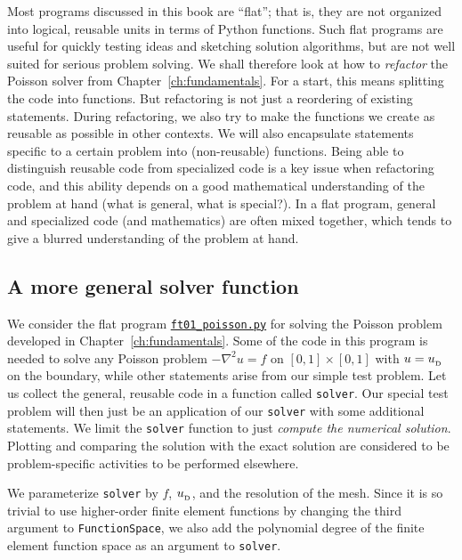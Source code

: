 \documentclass[graybox,envcountchap,sectrefs,final]{svmonodo}
\begin{document}

Most programs discussed in this book are ``flat''; that is, they are
not organized into logical, reusable units in terms of Python
functions. Such flat programs are useful for quickly testing ideas and
sketching solution algorithms, but are not well suited for serious
problem solving. We shall therefore look at how to \emph{refactor} the
Poisson solver from Chapter~\ref{ch:fundamentals}. For a start, this
means splitting the code into functions. But refactoring is not just a
reordering of existing statements. During refactoring, we also try to
make the functions we create as reusable as possible in other
contexts. We will also encapsulate statements specific to a certain
problem into (non-reusable) functions. Being able to distinguish
reusable code from specialized code is a key issue when refactoring
code, and this ability depends on a good mathematical understanding of
the problem at hand (what is general, what is special?).  In a flat
program, general and specialized code (and mathematics) are often
mixed together, which tends to give a blurred understanding of the
problem at hand.

\subsection{A more general solver function}
\label{ch:poisson0:impl2:func}

We consider the flat program
\href{{https://fenicsproject.org/pub/tutorial/python/vol1/ft01_poisson.py}}{\nolinkurl{ft01_poisson.py}}
for solving the Poisson problem developed
in Chapter~\ref{ch:fundamentals}.
Some of the code in this program
is needed to solve any Poisson problem $-\nabla^2 u=f$ on $[0,1]\times
[0,1]$ with $u=u_{_\mathrm{D}}$ on the boundary, while other statements arise from
our simple test problem. Let us collect the general, reusable code in
a function called \texttt{solver}. Our special test problem will then just be
an application of our \texttt{solver} with some additional statements. We limit
the \texttt{solver} function to just \emph{compute the numerical
solution}. Plotting and comparing the solution with the exact solution
are considered to be problem-specific activities to be performed
elsewhere.

We parameterize \texttt{solver} by $f$, $u_{_\mathrm{D}}$, and the resolution of the
mesh. Since it is so trivial to use higher-order finite element
functions by changing the third argument to \texttt{FunctionSpace}, we
also add the polynomial degree of the finite element function space
as an argument to \texttt{solver}.
\end{document}
